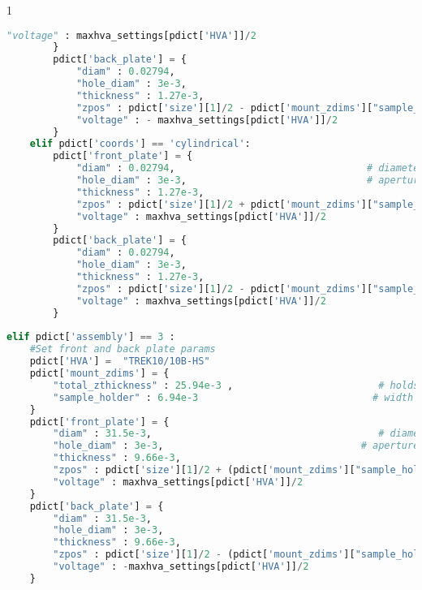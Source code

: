 \begin{spacing}{1}
\begin{lstlisting}[frame=single, language=Python]
            "voltage" : maxhva_settings[pdict['HVA']]/2                               # Voltage on front plate [V] (MAX value for associated HVA)
        }
        pdict['back_plate'] = {
            "diam" : 0.02794,
            "hole_diam" : 3e-3,
            "thickness" : 1.27e-3, 
            "zpos" : pdict['size'][1]/2 - pdict['mount_zdims']["sample_holder"]/2,
            "voltage" : - maxhva_settings[pdict['HVA']]/2
        }
    elif pdict['coords'] == 'cylindrical':
        pdict['front_plate'] = {
            "diam" : 0.02794,                                 # diameter of plate [m]
            "hole_diam" : 3e-3,                               # aperture diameter [m]
            "thickness" : 1.27e-3, 
            "zpos" : pdict['size'][1]/2 + pdict['mount_zdims']["sample_holder"]/2,    # location of plate surface (com) [m]
            "voltage" : maxhva_settings[pdict['HVA']]/2                                  # Voltage on front plate [V]
        }
        pdict['back_plate'] = {
            "diam" : 0.02794,
            "hole_diam" : 3e-3,
            "thickness" : 1.27e-3, 
            "zpos" : pdict['size'][1]/2 - pdict['mount_zdims']["sample_holder"]/2,
            "voltage" : maxhva_settings[pdict['HVA']]/2  
        }
        
elif pdict['assembly'] == 3 :
    #Set front and back plate params
    pdict['HVA'] =  "TREK10/10B-HS"
    pdict['mount_zdims'] = {
        "total_zthickness" : 25.94e-3 ,                         # holds both sample and both electrodes [m]
        "sample_holder" : 6.94e-3                              # width of lip that separates sample from electrodes [m] 
    }
    pdict['front_plate'] = {
        "diam" : 31.5e-3,                                       # diameter of plate [m]
        "hole_diam" : 3e-3,                                  # aperture diameter [m]
        "thickness" : 9.66e-3, 
        "zpos" : pdict['size'][1]/2 + (pdict['mount_zdims']["sample_holder"]/2),      # location of plate surface (com) [m]
        "voltage" : maxhva_settings[pdict['HVA']]/2                                     # Voltage on front plate [V]
    }
    pdict['back_plate'] = {
        "diam" : 31.5e-3,
        "hole_diam" : 3e-3,
        "thickness" : 9.66e-3, 
        "zpos" : pdict['size'][1]/2 - (pdict['mount_zdims']["sample_holder"]/2),
        "voltage" : -maxhva_settings[pdict['HVA']]/2
    }
    

\end{lstlisting}
\end{spacing}
